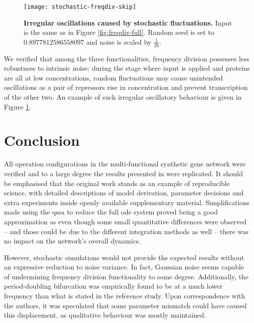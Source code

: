     \begin{figure}[!htbp]
      \centering
      \texttt{[image: stochastic-freqdiv-skip]}
      \caption{\textbf{Irregular oscillations caused by stochastic fluctuations.} Input is the same as in Figure \ref{fig:freqdiv-full}. Random seed is set to $0.8977812586558097$ and noise is scaled by $\frac{1}{26}$.}
      \label{fig:stochastic-freqdiv-skip}
    \end{figure}

    We verified that among the three functionalities, frequency division possesses less robustness to intrinsic noise: during the stage where input is applied and proteins are all at low concentrations, random fluctuations may cause unintended oscillations as a pair of repressors rise in concentration and prevent transcription of the other two.
    An example of such irregular oscillatory behaviour is given in Figure \ref{fig:stochastic-freqdiv-skip}.


\section{Conclusion}

  All operation configurations in the multi-functional synthetic gene network were verified and to a large degree the results presented in \cite{multif} were replicated.
  It should be emphasised that the original work stands as an example of reproducible science, with detailed descriptions of model derivation, parameter decisions and extra experiments inside openly available supplementary material.
  Simplifications made using the \ac{qssa} to reduce the full \ac{ode} system proved being a good approximation as even though some small quantitative differences were observed -- and those could be due to the different integration methods as well -- there was no impact on the network's overall dynamics.

  However, stochastic simulations would not provide the expected results without an expressive reduction to noise variance.
  In fact, Gaussian noise seems capable of undermining frequency division functionality to some degree.
  Additionally, the period-doubling bifurcation was empirically found to be at a much lower frequency than what is stated in the reference study.
  Upon correspondence with the authors, it was speculated that some parameter mismatch could have caused this displacement, as qualitative behaviour was mostly maintained.

